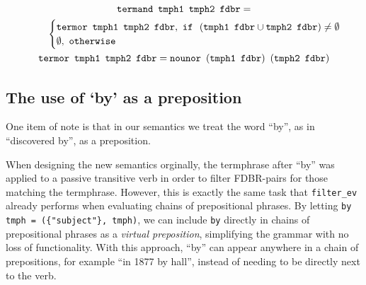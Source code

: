 \documentclass[../main.tex]{subfiles}
\begin{document}
\begin{gather*}
  \mathtt{termand}\enspace \mathtt{tmph1}\enspace \mathtt{tmph2}\enspace \mathtt{fdbr} = \\ \indent\indent
  \begin{cases}
    \mathtt{termor}\enspace \mathtt{tmph1}\enspace \mathtt{tmph2}\enspace \mathtt{fdbr},\ \mathtt{if} \enspace \left(\mathtt{tmph1}\enspace \mathtt{fdbr} \cup
    \mathtt{tmph2}\enspace \mathtt{fdbr}\right) \neq \mathtt{\emptyset} \\
    \emptyset,\ \mathtt{otherwise}
  \end{cases} \\
  \mathtt{termor}\enspace \mathtt{tmph1} \enspace \mathtt{tmph2} \enspace \mathtt{fdbr} = \mathtt{nounor}\enspace (\mathtt{tmph1}\enspace \mathtt{fdbr}) \enspace (\mathtt{tmph2} \enspace \mathtt{fdbr})
\end{gather*}

\subsection{The use of `by' as a preposition}

One item of note is that in our semantics we treat the word ``by'', as in ``discovered by'', as a preposition.

When designing the new semantics orginally, the termphrase after ``by'' was
applied to a passive transitive verb in order to filter FDBR-pairs for those matching
the termphrase.  However, this is exactly the same task that \texttt{filter\_ev} already performs when evaluating chains of prepositional phrases.
By letting \texttt{by tmph = (\{"subject"\}, tmph)}, we can include \texttt{by}
directly in chains of prepositional phrases as a {\em virtual preposition}, simplifying the grammar
with no loss of functionality.  With this approach, ``by'' can appear anywhere in a chain of prepositions, for example ``in 1877 by hall'', instead
of needing to be directly next to the verb.
\end{document}
